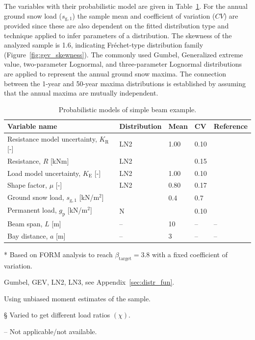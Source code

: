 The variables with their probabilistic model are given in Table~\ref{tab:prob_model_IABSE}. For the annual ground snow load ($s_\mathrm{g,1}$) the sample mean and coefficient of variation ($CV$) are provided since these are also dependent on the fitted distribution type and technique applied to infer parameters of a distribution. The skewness of the analyzed sample is 1.6, indicating Fréchet-type distribution family (Figure~\ref{fig:gev_skewness}). The commonly used Gumbel, Generalized extreme value, two-parameter Lognormal, and three-parameter Lognormal distributions are applied to represent the annual ground snow maxima. The connection between the 1-year and 50-year maxima distributions is established by assuming that the annual maxima are mutually independent.

\begin{table}[htbp!]
\caption{Probabilistic models of simple beam example.}
\centering
\label{tab:prob_model_IABSE}
\small
	\begin{threeparttable}
    \begin{tabular}{l l l l m{3cm}}
    \toprule
    Variable name  & Distribution & Mean & CV & Reference \\
    \midrule
    \rowcolor{lightgrey} Resistance model uncertainty, $K_\mathrm{R}$ [-]  & LN2 & 1.00 & 0.10 & \cite{JCSS_resi} \\
    Resistance, $R$ [kNm] & LN2 & \tnote{*} & 0.15 & \cite{JCSS_resi} \\
    \rowcolor{lightgrey} Load model uncertainty, $K_\mathrm{E}$ [-] & LN2 & 1.00 & 0.10 & \cite{JCSS_load} \\
    Shape factor, $\mu$ [-] & LN2 & 0.80 & 0.17 & \cite{Ellingwood1985} \\
    \rowcolor{lightgrey} Ground snow load, $s_\mathrm{g,1}$ [kN/m$^2$] & \tnote{\textdagger} & 0.4\tnote{\ddag} & 0.7\tnote{\ddag} & \cite{Szalai2013} \\
    Permanent load, $g_\mathrm{p}$ [kN/m$^2$] & N & \tnote{\S} & 0.10 & \cite{JCSS_load} \\
    \rowcolor{lightgrey} Beam span, $L$ [m] & -- & 10 & -- & -- \\
     Bay distance, $a$ [m] & -- & 3 & -- & -- \\
    \bottomrule
    \end{tabular}
    \begin{tablenotes}
    	\item[*] Based on FORM analysis to reach $\beta_\mathrm{target} = 3.8$ with a fixed coefficient of variation.
	    \item[\textdagger] Gumbel, GEV, LN2, LN3, see Appendix~\ref{sec:distr_fun}.
	    \item[\ddag] Using unbiased moment estimates of the sample.
	    \item[\S] Varied to get different load ratios $(\chi)$.
	    \item -- Not applicable/not available.
   	\end{tablenotes}
   	\end{threeparttable}
\end{table}


